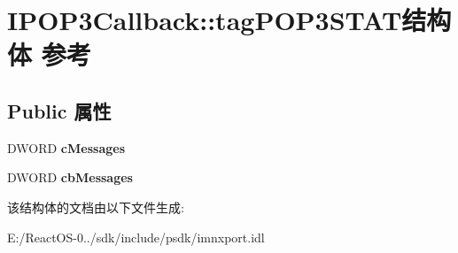 \hypertarget{struct_i_p_o_p3_callback_1_1tag_p_o_p3_s_t_a_t}{}\section{I\+P\+O\+P3\+Callback\+:\+:tag\+P\+O\+P3\+S\+T\+A\+T结构体 参考}
\label{struct_i_p_o_p3_callback_1_1tag_p_o_p3_s_t_a_t}
\subsection*{Public 属性}
\begin{DoxyCompactItemize}
\item 
\mbox{\label{struct_i_p_o_p3_callback_1_1tag_p_o_p3_s_t_a_t_aabb68399a640bd46f4d608f4eac9a4a8}} 
D\+W\+O\+RD {\bfseries c\+Messages}
\item 
\mbox{\label{struct_i_p_o_p3_callback_1_1tag_p_o_p3_s_t_a_t_addc31d73cd1ab64d42268e23b9d1b835}} 
D\+W\+O\+RD {\bfseries cb\+Messages}
\end{DoxyCompactItemize}


该结构体的文档由以下文件生成\+:\begin{DoxyCompactItemize}
\item 
E\+:/\+React\+O\+S-\/0../sdk/include/psdk/imnxport.\+idl\end{DoxyCompactItemize}
